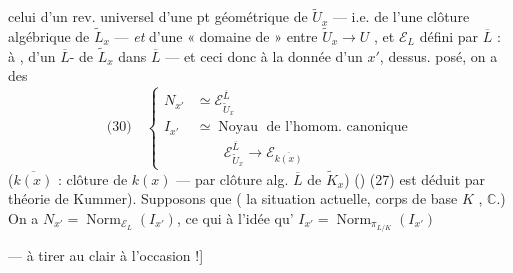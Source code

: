 \documentclass[11pt,a4paper]{article}
\begin{document}
celui d'un rev. universel   d'une
pt géométrique de $\tilde{U}_x$ --- i.e. de l'une
clôture algébrique de $\tilde{L}_x$ --- \emph{et} d'une
\struck{\ill{}} « domaine de \ill{} » entre $\tilde{U}_x \to U$ \ill{} ,
et $\mathcal{E}_L$ défini par $\overline{L}$ :  
 à \ill{}, d'un $\overline{L}$-\ill{} de
\struck{\ill{}} $\tilde{L}_x$ dans $\overline{L}$ --- et ceci \ill{} \ill{}
donc  à la donnée d'un
$x'$,   dessus. 
posé, on a des 
\[
\text{(30)} \quad
\left\{
\begin{aligned}
N_{x'} &\simeq \mathcal{E}^{\overline{L}}_{\tilde{U}_x} \\
I_{x'} &\simeq \operatorname{Noyau} \text{ de l'homom. canonique} \\
& \qquad \mathcal{E}^{\overline{L}}_{\tilde{U}_x} \longrightarrow \mathcal{E}_{\overline{k(x)}}
\end{aligned}
\right.
\]
($\overline{k(x)}$ : clôture  de $k(x)$ ---  par  clôture alg.
$\overline{L}$ de $\tilde{K}_x$)
(\struck{\ill{}})  (27) est déduit par théorie de Kummer).
Supposons que ( la situation actuelle,
 corps de base $K$
\ill{} , \uncertain{\ill{}} $\mathbb{C}$.)
On a \quad $N_{x'} = \operatorname{Norm}_{\mathcal{E}_L}(I_{x'})$, ce qui  \ill{}
à l'idée qu' \quad $I_{x'} = \operatorname{Norm}_{\pi_{L/K}}(I_{x'})$

--- à tirer au clair à l'occasion !]
\end{document}
